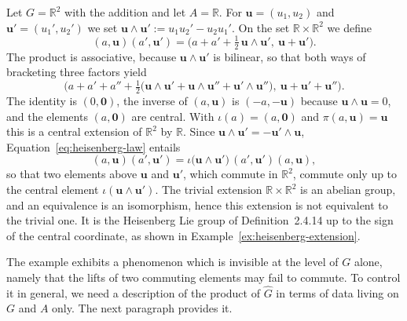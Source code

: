 \begin{example}\label{ex:heisenberg-group}
	Let $G=\mathbb{R}^2$ with the addition and let $A=\mathbb{R}$. For $\mathbf{u}=(u_1,u_2)$ and $\mathbf{u}'=(u_1',u_2')$ we set $\mathbf{u}\wedge\mathbf{u}':=u_1u_2'-u_2u_1'$. On the set $\mathbb{R}\times\mathbb{R}^2$ we define
	\begin{equation}\label{eq:heisenberg-law}
		(a,\mathbf{u})(a',\mathbf{u}')=\Big(a+a'+\tfrac12\,\mathbf{u}\wedge\mathbf{u}',\ \mathbf{u}+\mathbf{u}'\Big).
	\end{equation}
	The product is associative, because $\mathbf{u}\wedge\mathbf{u}'$ is bilinear, so that both ways of bracketing three factors yield
	\begin{equation*}
		\Big(a+a'+a''+\tfrac12\big(\mathbf{u}\wedge\mathbf{u}'+\mathbf{u}\wedge\mathbf{u}''+\mathbf{u}'\wedge\mathbf{u}''\big),\ \mathbf{u}+\mathbf{u}'+\mathbf{u}''\Big).
	\end{equation*}
	The identity is $(0,\mathbf{0})$, the inverse of $(a,\mathbf{u})$ is $(-a,-\mathbf{u})$ because $\mathbf{u}\wedge\mathbf{u}=0$, and the elements $(a,\mathbf{0})$ are central. With $\iota(a)=(a,\mathbf{0})$ and $\pi(a,\mathbf{u})=\mathbf{u}$ this is a central extension of $\mathbb{R}^2$ by $\mathbb{R}$. Since $\mathbf{u}\wedge\mathbf{u}'=-\mathbf{u}'\wedge\mathbf{u}$, Equation~\eqref{eq:heisenberg-law} entails
	\begin{equation*}
		(a,\mathbf{u})(a',\mathbf{u}')=\iota\big(\mathbf{u}\wedge\mathbf{u}'\big)\,(a',\mathbf{u}')(a,\mathbf{u}),
	\end{equation*}
	so that two elements above $\mathbf{u}$ and $\mathbf{u}'$, which commute in $\mathbb{R}^2$, commute only up to the central element $\iota(\mathbf{u}\wedge\mathbf{u}')$. The trivial extension $\mathbb{R}\times\mathbb{R}^2$ is an abelian group, and an equivalence is an isomorphism, hence this extension is not equivalent to the trivial one. It is the Heisenberg Lie group of Definition~2.4.14 up to the sign of the central coordinate, as shown in Example~\ref{ex:heisenberg-extension}.
\end{example}

The example exhibits a phenomenon which is invisible at the level of $G$ alone, namely that the lifts of two commuting elements may fail to commute. To control it in general, we need a description of the product of $\widehat{G}$ in terms of data living on $G$ and $A$ only. The next paragraph provides it.

